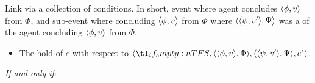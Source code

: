 \begin{note}
  Link via a collection of conditions.
  In short, event where agent concludes \(\langle \phi, v \rangle\) from \(\Phi\), and sub-event where concluding \(\langle \phi, v \rangle\) from \(\Phi\) where \(\langle \langle \psi, v' \rangle, \Psi \rangle\) was a \requ{} of the agent concluding \(\langle \phi, v \rangle\) from \(\Phi\).

  \begin{definition}[\rCon{2}]
    \label{def:rCon}

    \begin{itemize}
    \item
      The \emph{} hold of \(e\) with respect to \(\langle \vAgent{}, \pvp{\phi}{v}{\Phi}, \pvp{\psi}{v'}{\Psi}, e^{\flat} \rangle\).
    \end{itemize}

    \emph{If and only if}:


\end{definition}
\end{note}
